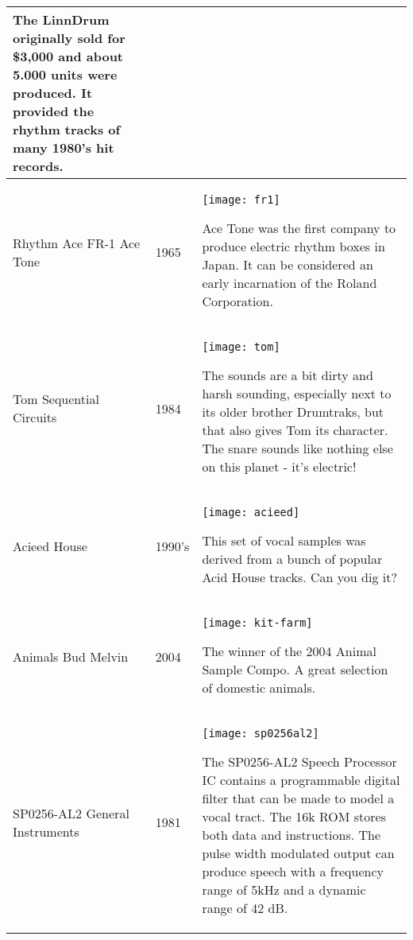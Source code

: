 \begin{xtabular}{p{2.02cm}|l|p{7.8cm}}
The LinnDrum originally sold for \$3,000 and about 5.000 units were produced. It provided the rhythm tracks of many 1980's hit records. \\
\hline
Rhythm Ace \linebreak
FR-1 \linebreak
Ace Tone & 1965 & 
\texttt{[image: fr1]}

Ace Tone was the first company to produce electric rhythm boxes in Japan. It can be considered an early incarnation of the Roland Corporation. \\
\hline
Tom \linebreak
Sequential \linebreak
Circuits & 1984 & 
\texttt{[image: tom]}

The sounds are a bit dirty and harsh sounding, especially next to its older brother Drumtraks, but that also gives Tom its character. The snare sounds like nothing else on this planet - it's electric! \\
\hline
Acieed House & 1990's & 
\texttt{[image: acieed]}

This set of vocal samples was derived from a bunch of popular Acid House tracks. Can you dig it? \\

\hline
Animals \linebreak Bud Melvin & 2004 & 
\texttt{[image: kit-farm]} 

The winner of the 2004 Animal Sample Compo. A great selection of domestic animals. \\

\hline
SP0256-AL2 \linebreak
General Instruments 
& 1981 & 
\texttt{[image: sp0256al2]}

The SP0256-AL2 Speech Processor IC contains a programmable digital filter that can be made to model a vocal tract. The 16k ROM stores both data and instructions. The pulse width modulated output can produce speech with a frequency range of 5kHz and a dynamic range of 42 dB. \\

\end{xtabular}

